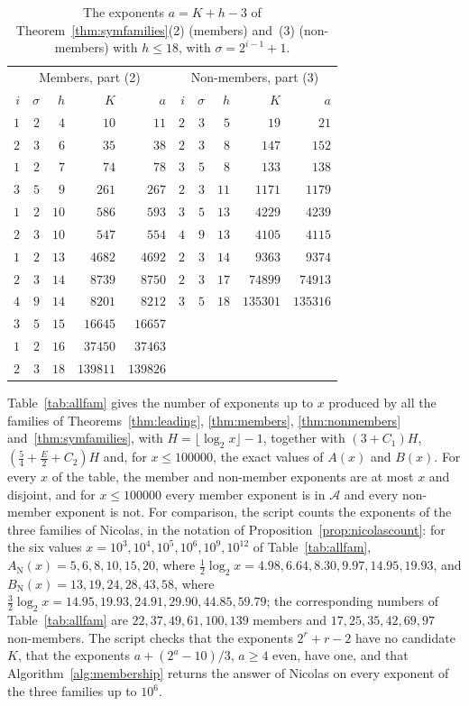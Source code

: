 \documentclass[11pt]{amsart}
\theoremstyle{definition}
\begin{document}
\begin{table}[H]
\centering
\caption{The exponents $a=K+h-3$ of Theorem~\ref{thm:symfamilies}(2) (members) and~(3) (non-members) with $h\le18$, with $\sigma=2^{i-1}+1$.}
\label{tab:symfam}
\begin{tabular}{rrrrr@{\qquad}rrrrr}
\toprule
\multicolumn{5}{c}{Members, part (2)} & \multicolumn{5}{c}{Non-members, part (3)}\\
$i$ & $\sigma$ & $h$ & $K$ & $a$ & $i$ & $\sigma$ & $h$ & $K$ & $a$\\
\midrule
$1$ & $2$ & $4$ & $10$ & $11$ & $2$ & $3$ & $5$ & $19$ & $21$\\
$2$ & $3$ & $6$ & $35$ & $38$ & $2$ & $3$ & $8$ & $147$ & $152$\\
$1$ & $2$ & $7$ & $74$ & $78$ & $3$ & $5$ & $8$ & $133$ & $138$\\
$3$ & $5$ & $9$ & $261$ & $267$ & $2$ & $3$ & $11$ & $1171$ & $1179$\\
$1$ & $2$ & $10$ & $586$ & $593$ & $3$ & $5$ & $13$ & $4229$ & $4239$\\
$2$ & $3$ & $10$ & $547$ & $554$ & $4$ & $9$ & $13$ & $4105$ & $4115$\\
$1$ & $2$ & $13$ & $4682$ & $4692$ & $2$ & $3$ & $14$ & $9363$ & $9374$\\
$2$ & $3$ & $14$ & $8739$ & $8750$ & $2$ & $3$ & $17$ & $74899$ & $74913$\\
$4$ & $9$ & $14$ & $8201$ & $8212$ & $3$ & $5$ & $18$ & $135301$ & $135316$\\
$3$ & $5$ & $15$ & $16645$ & $16657$ & & & & &\\
$1$ & $2$ & $16$ & $37450$ & $37463$ & & & & &\\
$2$ & $3$ & $18$ & $139811$ & $139826$ & & & & &\\
\bottomrule
\end{tabular}
\end{table}

Table~\ref{tab:allfam} gives the number of exponents up to $x$ produced by all the families of Theorems~\ref{thm:leading}, \ref{thm:members}, \ref{thm:nonmembers} and~\ref{thm:symfamilies}, with $H=\lfloor\log_2x\rfloor-1$, together with $(3+C_1)H$, $(\frac54+\frac E2+C_2)H$ and, for $x\le100000$, the exact values of $A(x)$ and $B(x)$. For every $x$ of the table, the member and non-member exponents are at most $x$ and disjoint, and for $x\le100000$ every member exponent is in $\mathcal{A}$ and every non-member exponent is not. For comparison, the script counts the exponents of the three families of Nicolas, in the notation of Proposition~\ref{prop:nicolascount}: for the six values $x=10^3,10^4,10^5,10^6,10^9,10^{12}$ of Table~\ref{tab:allfam}, $A_{\mathrm{N}}(x)=5,6,8,10,15,20$, where $\frac12\log_2x=4.98,6.64,8.30,9.97,14.95,19.93$, and $B_{\mathrm{N}}(x)=13,19,24,28,43,58$, where $\frac32\log_2x=14.95,19.93,24.91,29.90,44.85,59.79$; the corresponding numbers of Table~\ref{tab:allfam} are $22,37,49,61,100,139$ members and $17,25,35,42,69,97$ non-members. The script checks that the exponents $2^r+r-2$ have no candidate $K$, that the exponents $a+(2^a-10)/3$, $a\ge4$ even, have one, and that Algorithm~\ref{alg:membership} returns the answer of Nicolas on every exponent of the three families up to $10^6$.
\end{document}
